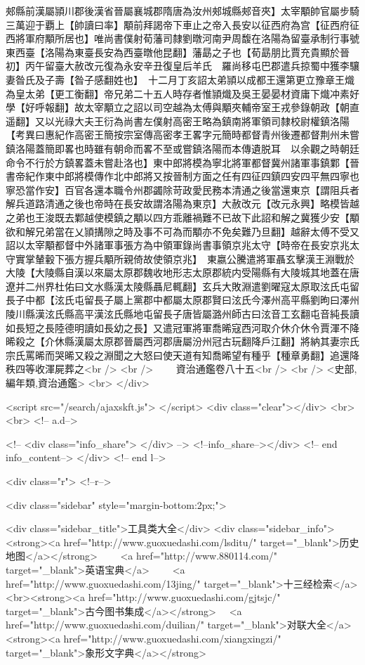 郟縣前漢屬頴川郡後漢省晉屬襄城郡隋唐為汝州郟城縣郟音夾】太宰顒帥官屬步騎三萬迎于覇上【帥讀曰率】顒前拜謁帝下車止之帝入長安以征西府為宫【征西府征西將軍府顒所居也】唯尚書僕射荀藩司隸劉暾河南尹周馥在洛陽為留臺承制行事號東西臺【洛陽為東臺長安為西臺暾他昆翻】藩勗之子也【荀勗朋比賈充貴顯於晉初】丙午留臺大赦改元復為永安辛丑復皇后羊氏　羅尚移屯巴郡遣兵掠蜀中獲李驤妻昝氏及子壽【昝子感翻姓也】　十二月丁亥詔太弟頴以成都王還第更立豫章王熾為皇太弟【更工衡翻】帝兄弟二十五人時存者惟頴熾及吳王晏晏材資庸下熾冲素好學【好呼報翻】故太宰顒立之詔以司空越為太傅與顒夾輔帝室王戎參錄朝政【朝直遥翻】又以光祿大夫王衍為尚書左僕射高密王略為鎮南將軍領司隸校尉權鎮洛陽　【考異曰惠紀作高密王簡按宗室傳高密孝王畧字元簡時都督青州後遷都督荆州未嘗鎮洛陽蓋簡即畧也時雖有朝命而畧不至或嘗鎮洛陽而本傳遺脱耳　以余觀之時朝廷命令不行於方鎮畧蓋未嘗赴洛也】東中郎將模為寧北將軍都督冀州諸軍事鎮鄴【晉書帝紀作東中郎將模傳作北中郎將又按晉制方面之任有四征四鎮四安四平無四寧也寧恐當作安】百官各還本職令州郡蠲除苛政愛民務本清通之後當還東京【謂阻兵者解兵道路清通之後也帝時在長安故謂洛陽為東京】大赦改元【改元永興】略模皆越之弟也王浚既去鄴越使模鎮之顒以四方乖離禍難不已故下此詔和解之冀獲少安【顒欲和解兄弟當在乂頴搆隙之時及事不可為而顒亦不免矣難乃旦翻】越辭太傅不受又詔以太宰顒都督中外諸軍事張方為中領軍錄尚書事領京兆太守【時帝在長安京兆太守實掌輦轂下張方握兵顒所親倚故使領京兆】　東嬴公騰遣將軍聶玄擊漢王淵戰於大陵【大陵縣自漢以來屬太原郡魏收地形志太原郡統内受陽縣有大陵城其地蓋在唐遼并二州界杜佑曰文水縣漢太陵縣聶尼輒翻】玄兵大敗淵遣劉曜寇太原取泫氏屯留長子中都【泫氏屯留長子屬上黨郡中都屬太原郡賢曰泫氏今澤州高平縣劉昫曰澤州陵川縣漢泫氏縣高平漢泫氏縣地屯留長子唐皆屬潞州師古曰泫音工玄翻屯音純長讀如長短之長陸德明讀如長幼之長】又遣冠軍將軍喬晞寇西河取介休介休令賈渾不降晞殺之【介休縣漢屬太原郡晉屬西河郡唐屬汾州冠古玩翻降戶江翻】將納其妻宗氏宗氏罵晞而哭晞又殺之淵聞之大怒曰使天道有知喬晞望有種乎【種章勇翻】追還降秩四等收渾屍葬之<br />
<br />
　　資治通鑑卷八十五<br />
<br />
<史部,編年類,資治通鑑>  <br>
   </div> 

<script src="/search/ajaxskft.js"> </script>
 <div class="clear"></div>
<br>
<br>
 <!-- a.d-->

 <!--
<div class="info_share">
</div> 
-->
 <!--info_share--></div>   <!-- end info_content-->
  </div> <!-- end l-->

<div class="r">   <!--r-->



<div class="sidebar"  style="margin-bottom:2px;">

 
<div class="sidebar_title">工具类大全</div>
<div class="sidebar_info">
<strong><a href="http://www.guoxuedashi.com/lsditu/" target="_blank">历史地图</a></strong>　　
<a href="http://www.880114.com/" target="_blank">英语宝典</a>　　
<a href="http://www.guoxuedashi.com/13jing/" target="_blank">十三经检索</a>　
<br><strong><a href="http://www.guoxuedashi.com/gjtsjc/" target="_blank">古今图书集成</a></strong>　
<a href="http://www.guoxuedashi.com/duilian/" target="_blank">对联大全</a>　<strong><a href="http://www.guoxuedashi.com/xiangxingzi/" target="_blank">象形文字典</a></strong>　

